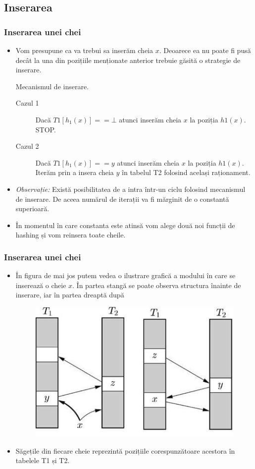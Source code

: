 \documentclass{beamer}
\begin{document}
\begin{frame}
\subsection{Inserarea}
\frametitle{Inserarea unei chei}
\begin{itemize}
\item Vom presupune ca va trebui sa inserăm cheia $x$. Deoarece ea nu poate fi pusă decât la una din pozițiile menționate anterior trebuie găsită o strategie de inserare.
\begin{block}{Mecanismul de inserare.}


\begin{description}
  \item[Cazul 1] Dacă $T1[h_1(x)] == \bot$ atunci inserăm cheia $x$ la poziția $h1(x)$. STOP.
  \item[Cazul 2] Dacă $T1[h_1(x)] == y$ atunci inserăm cheia $x$ la poziția $h1(x)$. Iterăm prin a insera cheia $y$ în tabelul T2 folosind același raționament.
\end{description}
\end{block}

\item \textit{Observație:} Există posibilitatea de a intra într-un ciclu folosind mecanismul de inserare. De aceea numărul de iterații va fi mărginit de o constantă superioară.
\item În momentul în care constanta este atinsă vom alege două noi funcții de hashing și vom reinsera toate cheile.
\end{itemize}
\end{frame}
\begin{frame}
\frametitle{Inserarea unei chei}
\begin{itemize}
\item În figura de mai jos putem vedea o ilustrare grafică a modului în care se inserează o cheie $x$. În partea stangă se poate observa structura înainte de inserare, iar în partea dreaptă după 

\begin{figure}
\includegraphics[width=0.4\linewidth]{cuckoo.jpg}
\end{figure}

\item Săgețile din fiecare cheie reprezintă pozițiile corespunzătoare acestora în tabelele T1 și T2.
\end{itemize}
\end{frame}
\end{document}

